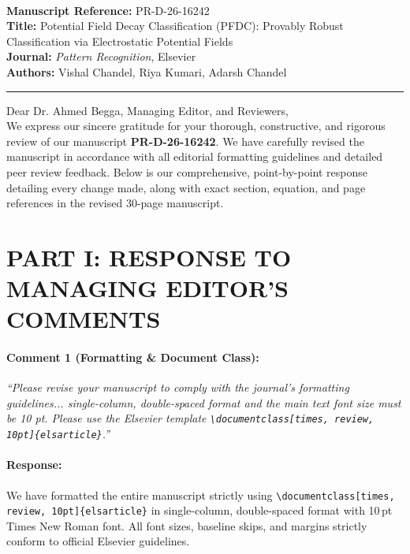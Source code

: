 \documentclass[10pt]{article}
\begin{document}
\\[0.5em]
\noindent\textbf{Manuscript Reference:} PR-D-26-16242\\
\textbf{Title:} Potential Field Decay Classification (PFDC): Provably Robust Classification via Electrostatic Potential Fields\\
\textbf{Journal:} \textit{Pattern Recognition}, Elsevier\\
\textbf{Authors:} Vishal Chandel, Riya Kumari, Adarsh Chandel\\[1em]
\hrule\vspace{1em}

\noindent Dear Dr. Ahmed Begga, Managing Editor, and Reviewers,\\[0.5em]
We express our sincere gratitude for your thorough, constructive, and rigorous review of our manuscript \textbf{PR-D-26-16242}. We have carefully revised the manuscript in accordance with all editorial formatting guidelines and detailed peer review feedback. Below is our comprehensive, point-by-point response detailing every change made, along with exact section, equation, and page references in the revised 30-page manuscript.\\[1em]

\section*{PART I: RESPONSE TO MANAGING EDITOR'S COMMENTS}

\paragraph{Comment 1 (Formatting \& Document Class):}
\textit{``Please revise your manuscript to comply with the journal's formatting guidelines... single-column, double-spaced format and the main text font size must be 10 pt. Please use the Elsevier template \texttt{\textbackslash documentclass[times, review, 10pt]\{elsarticle\}}.''}

\paragraph{Response:}
We have formatted the entire manuscript strictly using \texttt{\textbackslash documentclass[times, review, 10pt]\{elsarticle\}} in single-column, double-spaced format with 10\,pt Times New Roman font. All font sizes, baseline skips, and margins strictly conform to official Elsevier guidelines.
\end{document}
